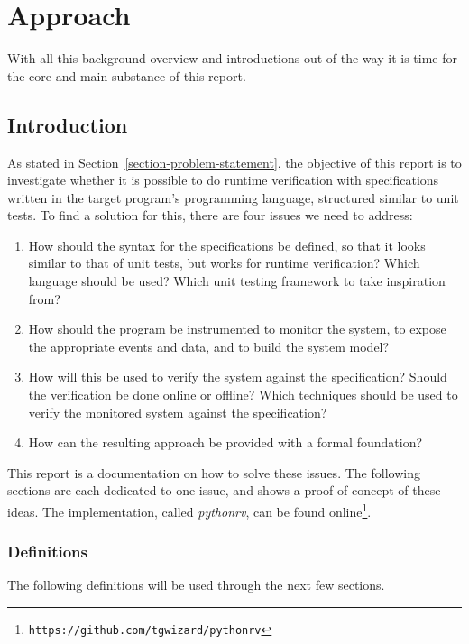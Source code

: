 \documentclass[a4paper,11pt]{kth-mag}
\begin{document}
\pagestyle{newchap}
\chapter{Approach} \label{chapter-approach}

With all this background overview and introductions out of the way it is time
for the core and main substance of this report.

\section{Introduction}

As stated in Section~\ref{section-problem-statement}, the objective of this
report is to investigate whether it is possible to do runtime verification with
specifications written in the target program's programming language, structured
similar to unit tests. To find a solution for this, there are four issues we
need to address:

\begin{enumerate}
  \item How should the syntax for the specifications be defined, so that it
    looks similar to that of unit tests, but works for runtime verification?
    Which language should be used? Which unit testing framework to take
    inspiration from?
	\item How should the program be instrumented to monitor the system, to expose
		the appropriate events and data, and to build the system model?
  \item How will this be used to verify the system against the specification?
    Should the verification be done online or offline? Which techniques should
    be used to verify the monitored system against the specification?
	\item How can the resulting approach be provided with a formal foundation?
\end{enumerate}

This report is a documentation on how to solve these issues. The following
sections are each dedicated to one issue, and shows a proof-of-concept of these
ideas. The implementation, called \textit{pythonrv}, can be found
online\footnote{\texttt{https://github.com/tgwizard/pythonrv}}.


\subsection{Definitions}

The following definitions will be used through the next few sections.
\end{document}
